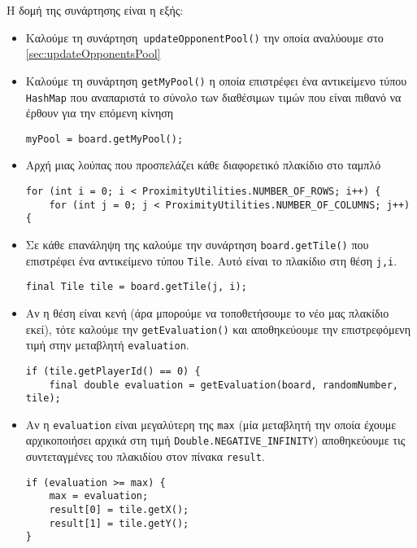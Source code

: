 Η δομή της συνάρτησης είναι η εξής:\begin{itemize}
\item Καλούμε τη συνάρτηση\lstinline! updateOpponentPool()! την 
οποία αναλύουμε στο \hyperref[sec:updateOpponentsPool]{\ref{sec:updateOpponentsPool}}

\item Καλούμε τη συνάρτηση \lstinline!getMyPool()! η οποία επιστρέφει ένα αντικείμενο τύπου \lstinline!HashMap! που αναπαριστά το σύνολο των διαθέσιμων τιμών που είναι πιθανό να έρθουν για την επόμενη κίνηση
\begin{lstlisting}[numbers=none, aboveskip=\smallskipamount, belowskip=\smallskipamount, captionpos=none]
myPool = board.getMyPool();
\end{lstlisting}

\item Αρχή μιας λούπας που προσπελάζει κάθε διαφορετικό πλακίδιο στο ταμπλό
\begin{lstlisting}[numbers=none, aboveskip=\smallskipamount, belowskip=\smallskipamount, captionpos=none]
for (int i = 0; i < ProximityUtilities.NUMBER_OF_ROWS; i++) {
    for (int j = 0; j < ProximityUtilities.NUMBER_OF_COLUMNS; j++) {
\end{lstlisting}

\item Σε κάθε επανάληψη της καλούμε την συνάρτηση \lstinline!board.getTile()! που επιστρέφει ένα αντικείμενο τύπου \lstinline!Tile!. Αυτό είναι το πλακίδιο στη θέση \lstinline!j,i!.
\begin{lstlisting}[numbers=none, aboveskip=\smallskipamount, belowskip=\smallskipamount, captionpos=none]
final Tile tile = board.getTile(j, i);
\end{lstlisting}

\item Αν η θέση είναι κενή (άρα μπορούμε να τοποθετήσουμε το νέο μας πλακίδιο εκεί),
τότε καλούμε την \lstinline!getEvaluation()! και αποθηκεύουμε την επιστρεφόμενη τιμή 
στην μεταβλητή \lstinline!evaluation!.
\begin{lstlisting}[breaklines=true, numbers=none, aboveskip=\smallskipamount, belowskip=\smallskipamount, captionpos=none]
if (tile.getPlayerId() == 0) {
    final double evaluation = getEvaluation(board, randomNumber, tile);
\end{lstlisting}

\item Αν η \lstinline!evaluation! είναι μεγαλύτερη της 
\lstinline!max! (μία μεταβλητή την οποία έχουμε αρχικοποιήσει αρχικά στη τιμή \lstinline!Double.NEGATIVE_INFINITY!) αποθηκεύουμε 
τις συντεταγμένες του πλακιδίου στον πίνακα \lstinline!result!.
\begin{lstlisting}[breaklines=true, numbers=none, aboveskip=\smallskipamount, belowskip=\smallskipamount, captionpos=none]
if (evaluation >= max) {
	max = evaluation;
	result[0] = tile.getX();
	result[1] = tile.getY();
}
\end{lstlisting}


\end{itemize}
